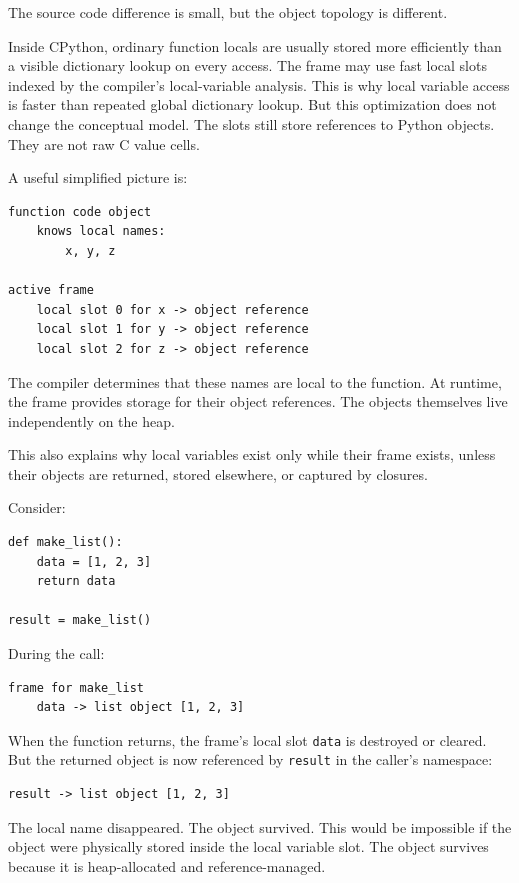 The source code difference is small, but the object topology is different.

Inside CPython, ordinary function locals are usually stored more efficiently than a visible dictionary lookup on every access. The frame may use fast local slots indexed by the compiler's local-variable analysis. This is why local variable access is faster than repeated global dictionary lookup. But this optimization does not change the conceptual model. The slots still store references to Python objects. They are not raw C value cells.

A useful simplified picture is:

\begin{verbatim}
function code object
    knows local names:
        x, y, z

active frame
    local slot 0 for x -> object reference
    local slot 1 for y -> object reference
    local slot 2 for z -> object reference
\end{verbatim}

The compiler determines that these names are local to the function. At runtime, the frame provides storage for their object references. The objects themselves live independently on the heap.

This also explains why local variables exist only while their frame exists, unless their objects are returned, stored elsewhere, or captured by closures.

Consider:

\begin{verbatim}
def make_list():
    data = [1, 2, 3]
    return data

result = make_list()
\end{verbatim}

During the call:

\begin{verbatim}
frame for make_list
    data -> list object [1, 2, 3]
\end{verbatim}

When the function returns, the frame's local slot \texttt{data} is destroyed or cleared. But the returned object is now referenced by \texttt{result} in the caller's namespace:

\begin{verbatim}
result -> list object [1, 2, 3]
\end{verbatim}

The local name disappeared. The object survived. This would be impossible if the object were physically stored inside the local variable slot. The object survives because it is heap-allocated and reference-managed.

